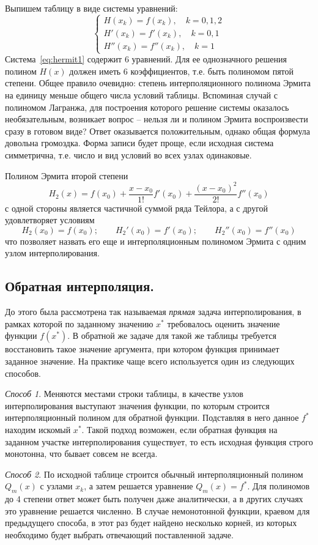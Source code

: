 Выпишем таблицу в виде системы уравнений:
\begin{equation}
    \begin{cases}
        H(x_k) = f(x_k), \quad k = 0, 1, 2 \\
        H'(x_k) = f'(x_k), \quad k = 0, 1 \\
        H''(x_k) = f''(x_k), \quad k = 1
    \end{cases}
    \label{eq:hermit1}
\end{equation}
Система~\eqref{eq:hermit1} содержит 6 уравнений. Для ее однозначного решения полином $H(x)$ должен иметь 6 коэффициентов,
т.е. быть полиномом пятой степени. Общее правило очевидно: степень интерполяционного полинома Эрмита на единицу меньше
общего числа условий таблицы. Вспоминая случай с полиномом Лагранжа, для построения которого решение системы оказалось
необязательным, возникает вопрос -- нельзя ли и полином Эрмита воспроизвести сразу в готовом виде? Ответ оказывается
положительным, однако общая формула довольна громоздка. Форма записи будет проще, если исходная система симметрична,
т.е. число и вид условий во всех узлах одинаковые.

Полином Эрмита второй степени
\begin{equation*}
    H_2(x) = f(x_0) + \frac{x - x_0}{1!}f'(x_0) + \frac{\left( x - x_0 \right)^2}{2!}f''(x_0)
\end{equation*}
с одной стороны является частичной суммой ряда Тейлора, а с другой удовлетворяет условиям
\begin{equation*}
    H_2(x_0) = f(x_0); \qquad H_2'(x_0) = f'(x_0); \qquad H_2''(x_0) = f''(x_0)
\end{equation*}
что позволяет назвать его еще и интерполяционным полиномом Эрмита с одним узлом интерполирования.

\subsection{Обратная интерполяция.}
До этого была рассмотрена так называемая \emph{прямая} задача интерполирования, в рамках которой по заданному значению
$x^{*}$ требовалось оценить значение функции $f(x^{*})$. В обратной же задаче для такой же таблицы требуется восстановить
такое значение аргумента, при котором функция принимает заданное значение. На практике чаще всего используется один из
следующих способов.

\emph{Способ 1}. Меняются местами строки таблицы, в качестве узлов интерполирования выступают значения функции, по
которым строится интерполяционный полином для обратной функции. Подставляя в него данное $f^{*}$ находим искомый $x^{*}$.
Такой подход возможен, если обратная функция на заданном участке интерполирования существует, то есть исходная функция
строго монотонна, что бывает совсем не всегда.

\emph{Способ 2}. По исходной таблице строится обычный интерполяционный полином $Q_m(x)$ с узлами $x_k$, а затем решается
уравнение $Q_m(x) = f^{*}$. Для полиномов до 4 степени ответ может быть получен даже аналитически, а в других случаях это
уравнение решается численно. В случае немонотонной функции, краевом для предыдущего способа, в этот раз будет найдено
несколько корней, из которых необходимо будет выбрать отвечающий поставленной задаче.
